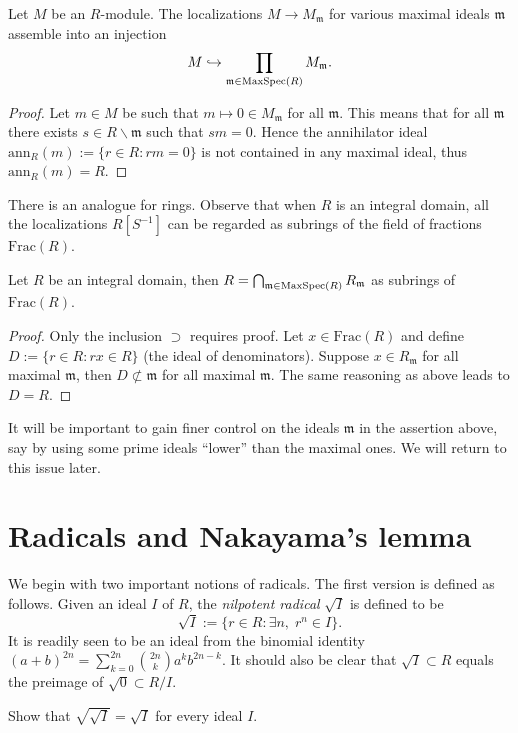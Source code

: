 \begin{lemma}
	Let $M$ be an $R$-module. The localizations $M \to M_{\mathfrak{m}}$ for various maximal ideals $\mathfrak{m}$ assemble into an injection
	\[ M \hookrightarrow \prod_{\mathfrak{m} \in \operatorname{MaxSpec}(R)} M_{\mathfrak{m}}. \]
\end{lemma}
\begin{proof}
	Let $m \in M$ be such that $m \mapsto 0 \in M_{\mathfrak{m}}$ for all $\mathfrak{m}$. This means that for all $\mathfrak{m}$ there exists $s \in R \smallsetminus \mathfrak{m}$ such that $sm=0$. Hence the annihilator ideal $\text{ann}_R(m) := \{r \in R: rm=0 \}$ is not contained in any maximal ideal, thus $\text{ann}_R(m) = R$.
\end{proof}
There is an analogue for rings. Observe that when $R$ is an integral domain, all the localizations $R[S^{-1}]$ can be regarded as subrings of the field of fractions $\text{Frac}(R)$.
\begin{lemma}
	Let $R$ be an integral domain, then $R = \bigcap_{\mathfrak{m} \in \operatorname{MaxSpec}(R)} R_{\mathfrak{m}}$ as subrings of $\mathrm{Frac}(R)$.
\end{lemma}
\begin{proof}
	Only the inclusion $\supset$ requires proof. Let $x \in \text{Frac}(R)$ and define $D := \{r \in R: rx \in R \}$ (the ideal of denominators). Suppose $x \in R_{\mathfrak{m}}$ for all maximal $\mathfrak{m}$, then $D \not\subset \mathfrak{m}$ for all maximal $\mathfrak{m}$. The same reasoning as above leads to $D=R$.
\end{proof}
It will be important to gain finer control on the ideals $\mathfrak{m}$ in the assertion above, say by using some prime ideals ``lower'' than the maximal ones. We will return to this issue later.

\section{Radicals and Nakayama's lemma}
We begin with two important notions of radicals. The first version is defined as follows. Given an ideal $I$ of $R$, the \emph{nilpotent radical} $\sqrt{I}$ is defined to be
\[ \sqrt{I} := \{ r \in R: \exists n, \; r^n \in I \}. \]
It is readily seen to be an ideal from the binomial identity $(a+b)^{2n} = \sum_{k=0}^{2n} \binom{2n}{k} a^k b^{2n-k}$. It should also be clear that $\sqrt{I} \subset R$ equals the preimage of $\sqrt{0} \subset R/I$. 

\begin{exercise}
	Show that $\sqrt{\sqrt{I}} = \sqrt{I}$ for every ideal $I$.
\end{exercise}

